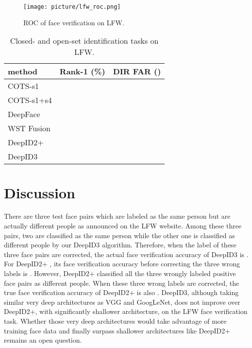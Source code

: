 \documentclass[10pt,twocolumn,letterpaper]{article}
\begin{document}
\begin{figure}[!h]
\begin{center}
\texttt{[image: picture/lfw\_roc.png]}
\end{center}
\caption{ROC  of face verification on LFW.}
\label{fig:lfw}
\end{figure}

\begin{table}[t]
\caption{Closed- and open-set identification tasks on LFW. }
\label{tab:lfw_id}
\begin{center}
\begin{tabular}{p{80pt}|p{50pt}|p{50pt}}
\toprule
method & Rank-1 (\%) & DIR   FAR () \\
\midrule
COTS-s1 \cite{best-rowden2014} &  &  \\
COTS-s1+s4 \cite{best-rowden2014} &  &  \\
DeepFace \cite{taigman2014a} &  &  \\
WST Fusion \cite{taigman2014b} &  &  \\
DeepID2+ \cite{sun2014c} &  &  \\
DeepID3 &  &  \\
\bottomrule
\end{tabular}
\end{center}
\vspace{-0.1in}
\end{table}


\section{Discussion}

There are three test face pairs which are labeled as the same person but are actually different people as announced on the LFW website. Among these three pairs, two are classified as the same person while the other one is classified as different people by our DeepID3 algorithm. Therefore, when the label of these three face pairs are corrected, the actual face verification accuracy of DeepID3 is . For DeepID2+ \cite{sun2014c}, its face verification accuracy before correcting the three wrong labels is . However, DeepID2+ classified all the three wrongly labeled positive face pairs as different people. When these three wrong labels are corrected, the true face verification accuracy of DeepID2+ is also  \cite{sun2014c}. DeepID3, although taking similar very deep architectures as VGG and GoogLeNet, does not improve over DeepID2+, with significantly shallower architecture, on the LFW face verification task. Whether those very deep architectures would take advantage of more training face data and finally surpass shallower architectures like DeepID2+ remains an open question.
\end{document}
